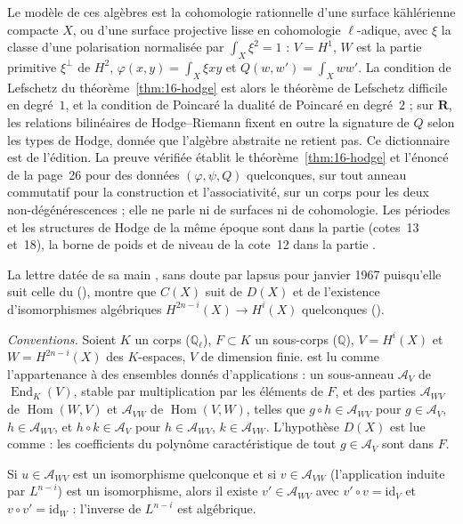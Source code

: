 \begin{remarque}
Le modèle de ces algèbres est la cohomologie rationnelle d'une surface kählérienne compacte $X$, ou d'une surface projective lisse en cohomologie $\ell$-adique, avec $\xi$ la classe d'une polarisation normalisée par $\int_X \xi^2 = 1$ : $V = H^1$, $W$ est la partie primitive $\xi^\perp$ de $H^2$, $\varphi(x, y) = \int_X \xi x y$ et $Q(w, w') = \int_X w w'$. La condition de Lefschetz du théorème~\ref{thm:16-hodge} est alors le théorème de Lefschetz difficile en degré~$1$, et la condition de Poincaré la dualité de Poincaré en degré~$2$ ; sur $\mathbf R$, les relations bilinéaires de Hodge--Riemann fixent en outre la signature de $Q$ selon les types de Hodge, donnée que l'algèbre abstraite ne retient pas. Ce dictionnaire est de l'édition. La preuve vérifiée établit le théorème~\ref{thm:16-hodge} et l'énoncé de la page~26 pour des données $(\varphi, \psi, Q)$ quelconques, sur tout anneau commutatif pour la construction et l'associativité, sur un corps pour les deux non-dégénérescences ; elle ne parle ni de surfaces ni de cohomologie. Les périodes et les structures de Hodge de la même époque sont dans la partie  (cotes~13 et~18), la borne de poids et de niveau de la cote~12 dans la partie .
\end{remarque}

La lettre datée de sa main , sans doute par lapsus pour janvier 1967 puisqu'elle suit celle du  (), montre que $C(X)$ suit de $D(X)$ et de l'existence d'isomorphismes algébriques $H^{2n-i}(X) \to H^i(X)$ quelconques ().

\noindent\emph{Conventions.} Soient $K$ un corps ($\mathbb Q_\ell$), $F \subset K$ un sous-corps ($\mathbb Q$), $V = H^i(X)$ et $W = H^{2n-i}(X)$ des $K$-espaces, $V$ de dimension finie.  est lu comme l'appartenance à des ensembles donnés d'applications : un sous-anneau $\mathcal A_V$ de $\operatorname{End}_K(V)$, stable par multiplication par les éléments de $F$, et des parties $\mathcal A_{WV}$ de $\operatorname{Hom}(W, V)$ et $\mathcal A_{VW}$ de $\operatorname{Hom}(V, W)$, telles que $g \circ h \in \mathcal A_{WV}$ pour $g \in \mathcal A_V$, $h \in \mathcal A_{WV}$, et $h \circ k \in \mathcal A_V$ pour $h \in \mathcal A_{WV}$, $k \in \mathcal A_{VW}$. L'hypothèse $D(X)$ est lue comme : les coefficients du polynôme caractéristique de tout $g \in \mathcal A_V$ sont dans $F$.

\begin{encadre}
\begin{theoreme}
Si $u \in \mathcal A_{WV}$ est un isomorphisme quelconque et si $v \in \mathcal A_{VW}$ (l'application induite par $L^{n-i}$) est un isomorphisme, alors il existe $v' \in \mathcal A_{WV}$ avec $v' \circ v = \mathrm{id}_V$ et $v \circ v' = \mathrm{id}_W$ : l'inverse de $L^{n-i}$ est algébrique.
\end{theoreme}
\end{encadre}


